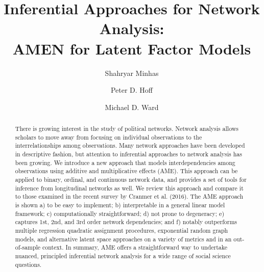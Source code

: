 \documentclass[12pt,pdflatex]{elsarticle}
\begin{document}
\thispagestyle{empty}
\begin{frontmatter}

\title{Inferential Approaches for Network Analysis: \\ AMEN for Latent Factor Models}


\author[duke]{Shahryar Minhas}
\author[duke2]{Peter D. Hoff}
\author[duke]{Michael D. Ward}

\address[duke]{Department of Political Science, Duke University, Durham, NC 27701, USA}
\address[duke2]{Departments of Statistics, Duke University, Durham, NC 27701, USA}

\begin{abstract}
There is growing interest in the study of political networks. Network analysis allows scholars to move away from focusing on individual observations to the interrelationships among observations. Many network approaches have been developed in descriptive fashion, but attention to inferential approaches to network analysis has been growing. We introduce a new approach that models interdependencies among observations using additive and multiplicative effects (AME). This approach can be applied to binary, ordinal, and continuous network data, and provides a set of tools for inference from longitudinal networks as well. We review this approach and compare it to those examined in the recent survey by Cranmer et al. (2016).  The AME approach is shown a) to be easy to implement; b) interpretable in a general linear model framework; c) computationally straightforward; d) not prone to degeneracy; e) captures 1st, 2nd, and 3rd order network dependencies; and f) notably outperforms multiple regression quadratic assignment procedures, exponential random graph models, and alternative latent space approaches on a variety of metrics and in an out-of-sample context. In summary, AME offers a straightforward way to undertake nuanced, principled inferential network analysis for a wide range of social science questions.
\end{abstract}

\end{frontmatter}

\newpage\setcounter{page}{1} 
\end{document}
